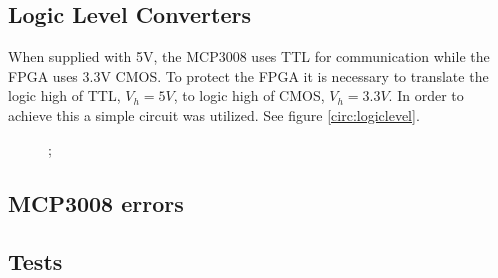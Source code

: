 \subsection{Logic Level Converters}
When supplied with 5V, the MCP3008 uses TTL for communication while the FPGA uses 3.3V CMOS. To protect the FPGA it is necessary to translate the logic high of TTL, $V_h=5V$, to logic high of CMOS, $V_h=3.3V$. In order to achieve this a simple circuit was utilized. See figure \ref{circ:logiclevel}. 
\begin{figure}
	\begin{circuitikz}
	;\end{circuitikz}
\end{figure}  
\subsection{MCP3008 errors}
\subsection{Tests}